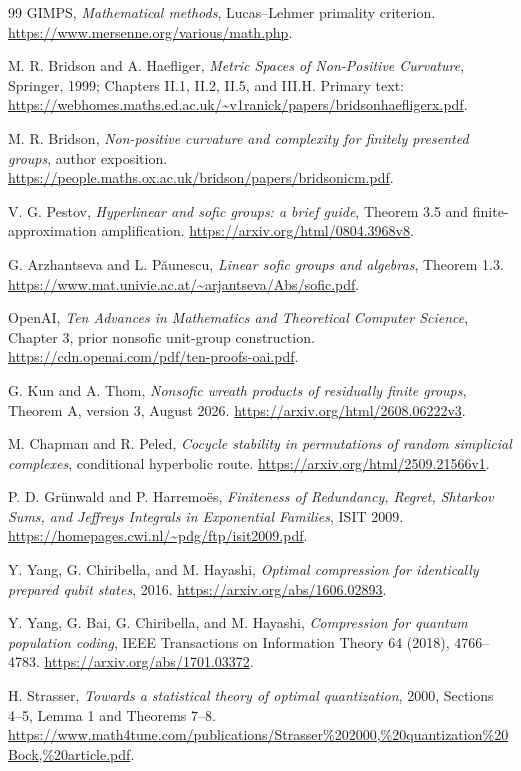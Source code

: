 \documentclass[11pt]{article}
\theoremstyle{definition}
\begin{document}
\begin{thebibliography}{99}
GIMPS, \emph{Mathematical methods}, Lucas--Lehmer primality criterion.
\url{https://www.mersenne.org/various/math.php}.

M. R. Bridson and A. Haefliger,
\emph{Metric Spaces of Non-Positive Curvature}, Springer, 1999;
Chapters II.1, II.2, II.5, and III.H.
Primary text:
\url{https://webhomes.maths.ed.ac.uk/~v1ranick/papers/bridsonhaefligerx.pdf}.

M. R. Bridson, \emph{Non-positive curvature and complexity for finitely
presented groups}, author exposition.
\url{https://people.maths.ox.ac.uk/bridson/papers/bridsonicm.pdf}.

V. G. Pestov, \emph{Hyperlinear and sofic groups: a brief guide},
Theorem 3.5 and finite-approximation amplification.
\url{https://arxiv.org/html/0804.3968v8}.

G. Arzhantseva and L. P\u{a}unescu,
\emph{Linear sofic groups and algebras}, Theorem 1.3.
\url{https://www.mat.univie.ac.at/~arjantseva/Abs/sofic.pdf}.

OpenAI, \emph{Ten Advances in Mathematics and Theoretical Computer Science},
Chapter 3, prior nonsofic unit-group construction.
\url{https://cdn.openai.com/pdf/ten-proofs-oai.pdf}.

G. Kun and A. Thom,
\emph{Nonsofic wreath products of residually finite groups},
Theorem A, version 3, August 2026.
\url{https://arxiv.org/html/2608.06222v3}.

M. Chapman and R. Peled,
\emph{Cocycle stability in permutations of random simplicial complexes},
conditional hyperbolic route.
\url{https://arxiv.org/html/2509.21566v1}.

P. D. Gr\"unwald and P. Harremo\"es,
\emph{Finiteness of Redundancy, Regret, Shtarkov Sums, and Jeffreys
Integrals in Exponential Families}, ISIT 2009.
\url{https://homepages.cwi.nl/~pdg/ftp/isit2009.pdf}.

Y. Yang, G. Chiribella, and M. Hayashi,
\emph{Optimal compression for identically prepared qubit states}, 2016.
\url{https://arxiv.org/abs/1606.02893}.

Y. Yang, G. Bai, G. Chiribella, and M. Hayashi,
\emph{Compression for quantum population coding},
IEEE Transactions on Information Theory 64 (2018), 4766--4783.
\url{https://arxiv.org/abs/1701.03372}.

H. Strasser, \emph{Towards a statistical theory of optimal quantization},
2000, Sections 4--5, Lemma 1 and Theorems 7--8.
\url{https://www.math4tune.com/publications/Strasser%202000,%20quantization%20Bock,%20article.pdf}.


\end{thebibliography}
\end{document}
